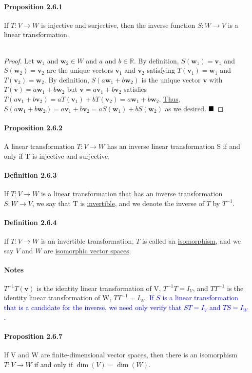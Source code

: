\documentclass[11pt]{article}
\newcommand{\tb}[1]{\textbf{#1}}
\newcommand{\under}[1]{\underline{#1}}
\newcommand{\litran}[0]{$T: V \rightarrow W$ }
\newcommand{\qed}[0]{$\hfill\blacksquare$}
\newcommand{\real}[0]{\mathbb{R}}
\newcommand{\vw}[0]{\tb{w}}
\newcommand{\vv}[0]{\tb{v}}
\begin{document}
{\paragraph{Proposition 2.6.1} If \litran is injective and surjective, then the inverse function $S: W \rightarrow V$ is a linear transformation.\\\\
\begin{proof}
	Let $\vw_1$ and $\vw_2 \in W$ and $a$ and $b \in \real$. By definition, $S(\vw_1) = \vv_1$ and $S(\vw_2) = \vv_2$ are the unique vectors $\vv_1$ and $\vv_2$ satisfying $T(\vv_1) = \vw_1$ and $T(\vv_2) = \vw_2$. By definition, $S(a\vw_1 + b\vw_2)$ is the unique vector $\vv$ with $T(\vv) = a\vw_1 + b\vw_2$ but $\vv = a\vv_1+b\vv_2$ satisfies $T(a\vv_1+b\vv_2) = aT(\vv_1) + bT(\vv_2) = a\vw_1+b\vw_2$. \under{Thus, $S(a\vw_1 + b\vw_2) = a\vv_1 + b\vv_2 = aS(\vw_1) + bS(\vw_2)$} as we desired. \qed 
\end{proof}
\paragraph{Proposition 2.6.2} A linear transformation \litran has an inverse linear transformation S if and only if T is injective and surjective.
\paragraph{Definition 2.6.3} If \litran is a linear transformation that has an inverse transformation $S: W \rightarrow V$, we say that T is \under{invertible}, and we denote the inverse of $T$ by $T^{-1}$.
\paragraph{Definition 2.6.4} If \litran is an invertible transformation, $T$ is called an \under{isomorphism}, and we say $V$ and $W$ are \under{isomorphic vector spaces}.

\paragraph{Notes}
$T^{-1}T(\vv)$ is the identity linear transformation of V, $T^{-1}T = I_V$, and $TT^{-1}$ is the identity linear transformation of W, $TT^{-1} = I_W$. \textcolor{blue}{If $S$ is a linear transformation that is a candidate for the inverse, we need only verify that $ST = I_V$ and $TS = I_W$.}
\paragraph{Proposition 2.6.7} If V and W are finite-dimensional vector spaces, then there is an isomorphism \litran if and only if $\dim(V) = \dim(W)$.
}
\end{document}

